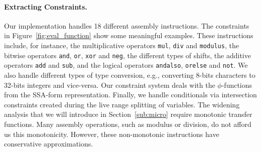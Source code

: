 \documentclass{llncs}
\begin{document}
\paragraph{Extracting Constraints.}
Our implementation handles 18 different assembly instructions.
The constraints in Figure~\ref{fig:eval_function} show some meaningful
examples.
These instructions include, for instance, the multiplicative operators
\texttt{mul}, \texttt{div} and \texttt{modulus},
the bitwise operators \texttt{and}, \texttt{or}, \texttt{xor} and \texttt{neg},
the different types of shifts, the additive operators \texttt{add} and
\texttt{sub}, and the logical operators \texttt{andalso}, \texttt{orelse} and
\texttt{not}.
We also handle different types of type conversion, e.g., converting 8-bits
characters to 32-bits integers and vice-versa.
Our constraint system deals with the $\phi$-functions from the SSA-form
representation.
Finally, we handle conditionals via intersection constraints created
during the live range splitting of variables.
The widening analysis that we will introduce in Section~\ref{sub:micro}
require monotonic transfer functions.
Many assembly operations, such as modulus or division, do not afford us
this monotonicity.
However, these non-monotonic instructions have conservative approximations.

%
\end{document}
